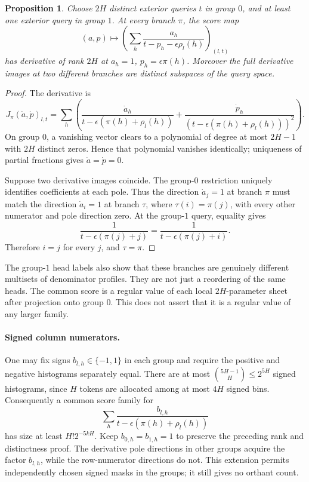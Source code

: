 \documentclass[11pt]{article}
\newtheorem{proposition}{Proposition}
\begin{document}
\begin{proposition}
Choose $2H$ distinct exterior queries $t$ in group $0$, and at least
one exterior query in group $1$. At every branch $\pi$, the score map
\[
 (a,p)\longmapsto
 \left(\sum_h\frac{a_h}{t-p_h-\epsilon\rho_l(h)}\right)_{(l,t)}
\]
has derivative of rank $2H$ at $a_h=1$, $p_h=\epsilon\pi(h)$.
Moreover the full derivative images at two different branches are
distinct subspaces of the query space.
\end{proposition}
\begin{proof}
The derivative is
\[
 J_\pi(\dot a,\dot p)_{l,t}
 =\sum_h\left(
 \frac{\dot a_h}{t-\epsilon(\pi(h)+\rho_l(h))}
 +\frac{\dot p_h}{(t-\epsilon(\pi(h)+\rho_l(h)))^2}\right).
\]
On group $0$, a vanishing vector clears to a polynomial of degree at
most $2H-1$ with $2H$ distinct zeros. Hence that polynomial vanishes
identically; uniqueness of partial fractions gives $\dot a=\dot p=0$.

Suppose two derivative images coincide. The group-$0$ restriction
uniquely identifies coefficients at each pole. Thus the direction
$\dot a_j=1$ at branch $\pi$ must match the direction
$\dot a_i=1$ at branch $\tau$, where $\tau(i)=\pi(j)$, with every
other numerator and pole direction zero. At the group-$1$ query,
equality gives
\[
 \frac1{t-\epsilon(\pi(j)+j)}
 =\frac1{t-\epsilon(\pi(j)+i)}.
\]
Therefore $i=j$ for every $j$, and $\tau=\pi$.
\end{proof}

The group-$1$ head labels also show that these branches are genuinely
different multisets of denominator profiles. They are not just a
reordering of the same heads. The common score is a regular value of
each local $2H$-parameter sheet after projection onto group $0$.
This does not assert that it is a regular value of any larger family.

\paragraph{Signed column numerators.}
One may fix signs $b_{l,h}\in\{-1,1\}$ in each group and require
the positive and negative histograms separately equal. There are at
most $\binom{5H-1}{H}\leq2^{5H}$ signed histograms, since $H$ tokens
are allocated among at most $4H$ signed bins. Consequently a common
score family for
\[
 \sum_h\frac{b_{l,h}}{t-\epsilon(\pi(h)+\rho_l(h))}
\]
has size at least $H!2^{-5kH}$. Keep $b_{0,h}=b_{1,h}=1$ to preserve
the preceding rank and distinctness proof. The derivative pole
directions in other groups acquire the factor $b_{l,h}$, while the
row-numerator directions do not. This extension permits independently
chosen signed masks in the groups; it still gives no orthant count.
\end{document}
